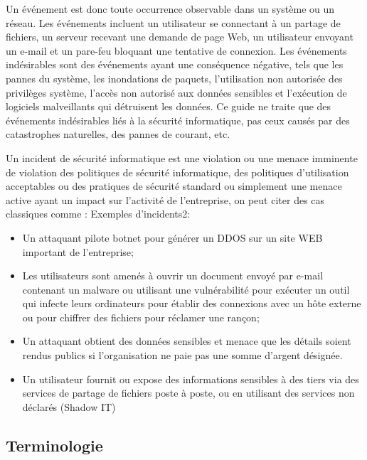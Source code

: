 Un événement est donc toute occurrence observable dans un système ou un réseau. Les événements incluent un utilisateur se connectant à un partage de fichiers, un serveur recevant une demande de page Web, un utilisateur envoyant un e-mail et un pare-feu bloquant une tentative de connexion. Les événements indésirables sont des événements ayant une conséquence négative, tels que les pannes du système, les inondations de paquets, l'utilisation non autorisée des privilèges système, l'accès non autorisé aux données sensibles et l'exécution de logiciels malveillants qui détruisent les données. Ce guide ne traite que des événements indésirables liés à la sécurité informatique, pas ceux causés par des catastrophes naturelles, des pannes de courant, etc.


Un incident de sécurité informatique est une violation ou une menace imminente de violation des politiques de sécurité informatique, des politiques d'utilisation acceptables ou des pratiques de sécurité standard ou simplement une menace active ayant un impact sur l'activité de l'entreprise, on peut citer des cas classiques comme :  Exemples d'incidents2:

\begin{itemize}
  \item Un attaquant pilote botnet pour générer un DDOS sur  un site WEB important de l'entreprise;
  \item Les utilisateurs sont amenés à ouvrir un document envoyé par e-mail contenant un malware ou utilisant une vulnérabilité pour exécuter un outil qui infecte leurs ordinateurs pour établir des connexions avec un hôte externe ou pour chiffrer des fichiers pour réclamer une rançon;
  \item Un attaquant obtient des données sensibles et menace que les détails soient rendus publics si l'organisation ne paie pas une somme d'argent désignée.
  \item Un utilisateur fournit ou expose des informations sensibles à des tiers via des services de partage de fichiers poste à poste, ou en utilisant des services non déclarés (Shadow IT)
\end{itemize}


\subsection{Terminologie}

